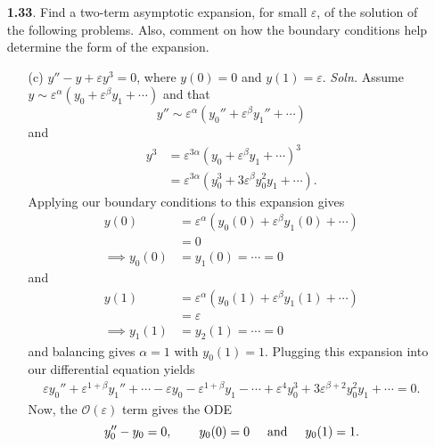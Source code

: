 \documentclass{article}
\begin{document}
\begin{itemize}
    \item[\textbf{1.33}.] Find a two-term asymptotic expansion, for small $\varepsilon$, of the solution of the following problems. Also, comment on how the boundary conditions help determine the form of the expansion. 
    \begin{itemize}
        \item[(c)] $y'' - y + \varepsilon y^3 = 0$, where $y(0) = 0$ and $y(1) = \varepsilon.$
        \newline\newline
        \textit{Soln.} Assume $y \sim \varepsilon^{\alpha}(y_0 + \varepsilon^{\beta}y_1 + \cdots)$ and that 
        \[y'' \sim \varepsilon^{\alpha}(y_0'' + \varepsilon^{\beta}y_1'' + \cdots)\]
        and
        \begin{align*}
            y^3 &= \varepsilon^{3\alpha}\left(y_0 + \varepsilon^{\beta}y_1 + \cdots\right)^3\\
            &= \varepsilon^{3\alpha}\left(y_0^3 + 3\varepsilon^{\beta}y_0^2y_1 + \cdots\right).
        \end{align*}
        Applying our boundary conditions to this expansion gives
        \begin{align*}
            y(0) &= \varepsilon^{\alpha}(y_0(0) + \varepsilon^{\beta}y_1(0) + \cdots)\\
            &= 0\\
            \implies y_0(0) &= y_1(0) = \cdots = 0
        \end{align*}
        and
        \begin{align*}
            y(1) &= \varepsilon^{\alpha}(y_0(1) + \varepsilon^{\beta}y_1(1) + \cdots)\\
            &= \varepsilon\\
            \implies y_1(1) &= y_2(1) = \cdots = 0
        \end{align*}
        and balancing gives $\alpha = 1$ with $y_0(1) = 1$.
        Plugging this expansion into our differential equation yields
        \begin{align*}
            \varepsilon y_0'' + \varepsilon^{1 + \beta}y_1'' + \cdots - \varepsilon y_0 - \varepsilon^{1 + \beta}y_1 - \cdots + \varepsilon^4y_0^3 +  3\varepsilon^{\beta + 2}y_0^2y_1 + \cdots = 0.
        \end{align*}
        Now, the $\mathcal{O}(\varepsilon)$ term gives the ODE
        \[y_0'' - y_0 = 0, \hspace{0.75cm} y_0(0) = 0 \hspace{0.5cm} \text{and} \hspace{0.5cm} y_0(1) = 1.\]

\end{itemize}
\end{itemize}
\end{document}
